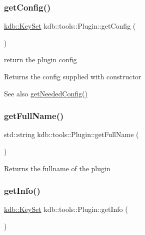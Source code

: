 \subsubsection{\texorpdfstring{getConfig()}{getConfig()}}
{\footnotesize\ttfamily \mbox{\hyperlink{classkdb_1_1KeySet}{kdb\+::\+Key\+Set}} kdb\+::tools\+::\+Plugin\+::get\+Config (\begin{DoxyParamCaption}{ }\end{DoxyParamCaption})}



return the plugin config 

\begin{DoxyReturn}{Returns}
the config supplied with constructor 
\end{DoxyReturn}
\begin{DoxySeeAlso}{See also}
\mbox{\hyperlink{classkdb_1_1tools_1_1Plugin_ad2a0a4a64d17c479e7cd8b1402275cc7}{get\+Needed\+Config()}} 
\end{DoxySeeAlso}
\mbox{\label{classkdb_1_1tools_1_1Plugin_acbe982e7bbb71aafb49b0d632e8650c9}} 
\subsubsection{\texorpdfstring{getFullName()}{getFullName()}}
{\footnotesize\ttfamily std\+::string kdb\+::tools\+::\+Plugin\+::get\+Full\+Name (\begin{DoxyParamCaption}{ }\end{DoxyParamCaption})}

\begin{DoxyReturn}{Returns}
the fullname of the plugin 
\end{DoxyReturn}
\mbox{\label{classkdb_1_1tools_1_1Plugin_aa4eac3b2b515104a0d595c717c546ec0}} 
\subsubsection{\texorpdfstring{getInfo()}{getInfo()}}
{\footnotesize\ttfamily \mbox{\hyperlink{classkdb_1_1KeySet}{kdb\+::\+Key\+Set}} kdb\+::tools\+::\+Plugin\+::get\+Info (\begin{DoxyParamCaption}{ }\end{DoxyParamCaption})\hspace{0.3cm}{\ttfamily [inline]}}




